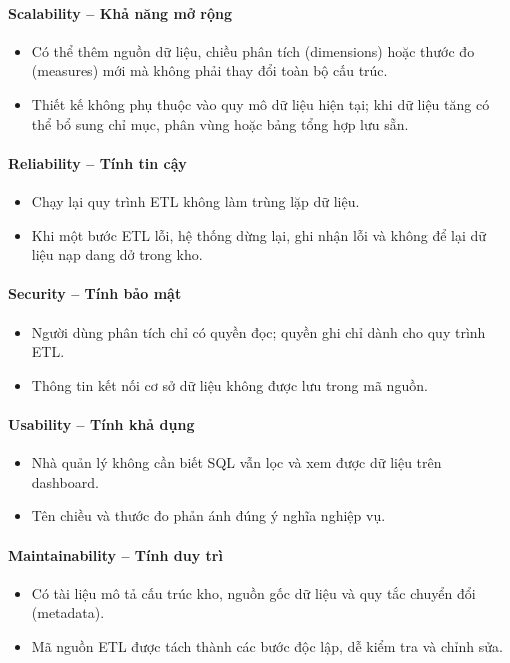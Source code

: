 \paragraph{Scalability -- Khả năng mở rộng}
\begin{itemize}
\item Có thể thêm nguồn dữ liệu, chiều phân tích (dimensions) hoặc thước đo (measures) mới mà không phải thay đổi toàn bộ cấu trúc.
\item Thiết kế không phụ thuộc vào quy mô dữ liệu hiện tại; khi dữ liệu tăng có thể bổ sung chỉ mục, phân vùng hoặc bảng tổng hợp lưu sẵn.
\end{itemize}

\paragraph{Reliability -- Tính tin cậy}
\begin{itemize}
\item Chạy lại quy trình ETL không làm trùng lặp dữ liệu.
\item Khi một bước ETL lỗi, hệ thống dừng lại, ghi nhận lỗi và không để lại dữ liệu nạp dang dở trong kho.
\end{itemize}

\paragraph{Security -- Tính bảo mật}
\begin{itemize}
\item Người dùng phân tích chỉ có quyền đọc; quyền ghi chỉ dành cho quy trình ETL.
\item Thông tin kết nối cơ sở dữ liệu không được lưu trong mã nguồn.
\end{itemize}

\paragraph{Usability -- Tính khả dụng}
\begin{itemize}
\item Nhà quản lý không cần biết SQL vẫn lọc và xem được dữ liệu trên dashboard.
\item Tên chiều và thước đo phản ánh đúng ý nghĩa nghiệp vụ.
\end{itemize}

\paragraph{Maintainability -- Tính duy trì}
\begin{itemize}
\item Có tài liệu mô tả cấu trúc kho, nguồn gốc dữ liệu và quy tắc chuyển đổi (metadata).
\item Mã nguồn ETL được tách thành các bước độc lập, dễ kiểm tra và chỉnh sửa.
\end{itemize}
